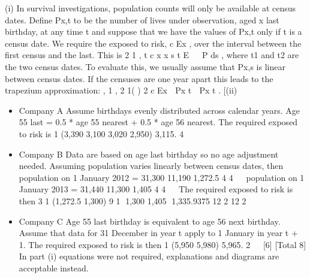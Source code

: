 \documentclass[a4paper,12pt]{article}
\begin{document}
 (i) In survival investigations, population counts will only be available at census
dates.
Define Px,t to be the number of lives under observation, aged x last birthday, at
any time t and suppose that we have the values of Px,t only if t is a census date.
We require the exposed to risk, c
Ex , over the interval between the first census
and the last.
This is
2
1
,
t
c
x x s
t
E   P ds , where t1 and t2 are the two census dates.
To evaluate this, we usually assume that Px,s is linear between census dates.
If the censuses are one year apart this leads to the trapezium approximation:
  , 1 , 2
1( )
2
c
Ex  Px t  Px t . [(ii) 
\begin{itemize}
    \item Company A
Assume birthdays evenly distributed across calendar years.
Age 55 last = 0.5 * age 55 nearest + 0.5 * age 56 nearest.
The required exposed to risk is
1 (3,390 3,100 3,020 2,950) 3,115.
4
   
\item Company B
Data are based on age last birthday so no age adjustment needed.
Assuming population varies linearly between census dates, then
population on 1 January 2012 = 31,300 11,190 1,272.5
4 4
 
population on 1 January 2013 = 31,440 11,300 1,405
4 4
 
The required exposed to risk is then
3 1 (1,272.5 1,300) 9 1 1,300 1,405 1,335.9375
12 2 12 2
   
\item Company C
Age 55 last birthday is equivalent to age 56 next birthday.
Assume that data for 31 December in year t apply to 1 January in
year t + 1.
The required exposed to risk is then
1 (5,950 5,980) 5,965.
2
  [6]
[Total 8]
In part (i) equations were not required, explanations and diagrams are acceptable instead.
\end{itemize}

\end{document}
